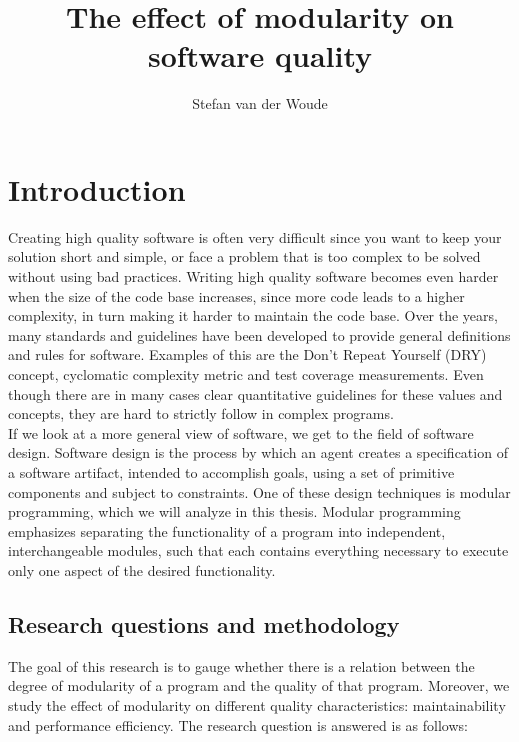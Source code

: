 \documentclass[twoside]{uva-inf-bachelor-thesis}
\title{The effect of modularity on software quality}
\author{Stefan van der Woude}
\begin{document}
\maketitle

\begin{abstract}

\end{abstract}

\tableofcontents


\chapter{Introduction}
Creating high quality software is often very difficult since you want to keep your solution short and simple, or face a problem that is too complex to be solved without using bad practices. Writing high quality software becomes even harder when the size of the code base increases, since more code leads to a higher complexity\cite{bhatia2014survey}, in turn making it harder to maintain the code base\cite{banker1993software}. Over the years, many standards and guidelines have been developed to provide general definitions and rules for software. Examples of this are the Don't Repeat Yourself (DRY) concept\cite{hunt2000pragmatic}, cyclomatic complexity metric\cite{mccabe1976complexity} and test coverage measurements\cite{miller1963systematic}. Even though there are in many cases clear quantitative guidelines for these values and concepts, they are hard to strictly follow in complex programs.\\

If we look at a more general view of software, we get to the field of software design. Software design is the process by which an agent creates a specification of a software artifact, intended to accomplish goals, using a set of primitive components and subject to constraints\cite{ralph2009proposal}. One of these design techniques is modular programming\cite{barnett1968modular}, which we will analyze in this thesis. Modular programming emphasizes separating the functionality of a program into independent, interchangeable modules, such that each contains everything necessary to execute only one aspect of the desired functionality.

\section{Research questions and methodology}
The goal of this research is to gauge whether there is a relation between the degree of modularity of a program and the quality of that program. Moreover, we study the effect of modularity on different quality characteristics: maintainability and performance efficiency. The research question is answered is as follows:
\end{document}
